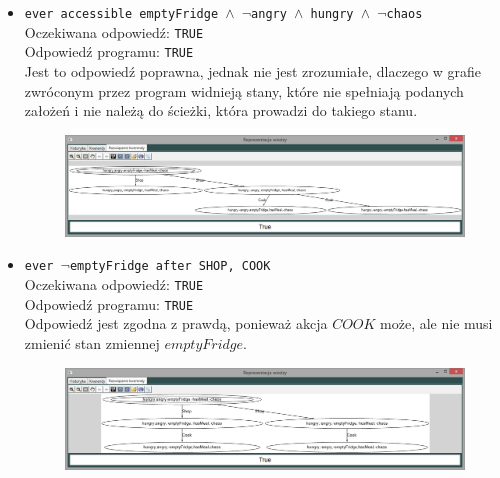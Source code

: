 \documentclass{article}
\begin{document}
\begin{itemize}
\begin{figure}[H]
    \end{figure}
    \item {\large\texttt{ever accessible emptyFridge $\wedge$ $\neg$angry $\wedge$ hungry $\wedge$ $\neg$chaos }}\\
    Oczekiwana odpowiedź: \texttt{TRUE}\\
    Odpowiedź programu: \texttt{TRUE}\\
    Jest to odpowiedź poprawna, jednak nie jest zrozumiałe, dlaczego w grafie zwróconym przez program widnieją stany, które nie spełniają podanych założeń i nie należą do ścieżki, która prowadzi do takiego stanu.
    \begin{figure}[H]
    \centering
    \includegraphics[scale=0.35]{test2_3}
    \end{figure}
    \item {\large\texttt{ever $\neg$emptyFridge after SHOP, COOK}}\\
    Oczekiwana odpowiedź: \texttt{TRUE}\\
    Odpowiedź programu: \texttt{TRUE}\\
    Odpowiedź jest zgodna z prawdą, ponieważ akcja $COOK$ może, ale nie musi zmienić stan zmiennej $emptyFridge$.
    \begin{figure}[H]
    \centering
    \includegraphics[scale=0.35]{test2_4}
    \end{figure}
\end{itemize}

\newpage
\end{document}
